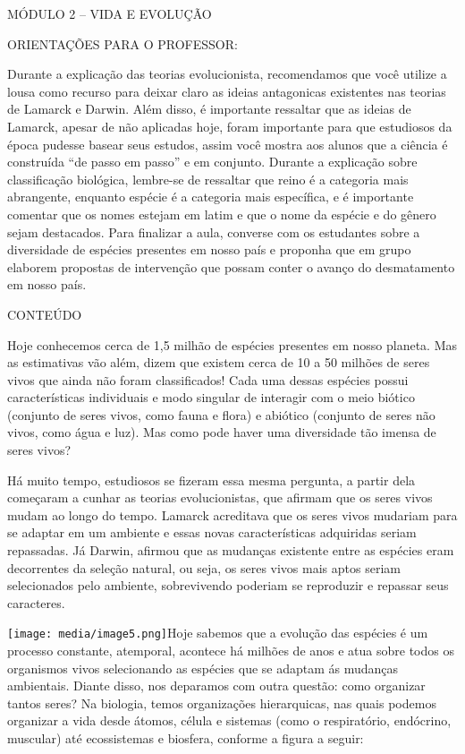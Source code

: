MÓDULO 2 -- VIDA E EVOLUÇÃO

ORIENTAÇÕES PARA O PROFESSOR:

Durante a explicação das teorias evolucionista, recomendamos que você
utilize a lousa como recurso para deixar claro as ideias antagonicas
existentes nas teorias de Lamarck e Darwin. Além disso, é importante
ressaltar que as ideias de Lamarck, apesar de não aplicadas hoje, foram
importante para que estudiosos da época pudesse basear seus estudos,
assim você mostra aos alunos que a ciência é construída ``de passo em
passo'' e em conjunto. Durante a explicação sobre classificação
biológica, lembre-se de ressaltar que reino é a categoria mais
abrangente, enquanto espécie é a categoria mais específica, e é
importante comentar que os nomes estejam em latim e que o nome da
espécie e do gênero sejam destacados. Para finalizar a aula, converse
com os estudantes sobre a diversidade de espécies presentes em nosso
país e proponha que em grupo elaborem propostas de intervenção que
possam conter o avanço do desmatamento em nosso país.

CONTEÚDO

Hoje conhecemos cerca de 1,5 milhão de espécies presentes em nosso
planeta. Mas as estimativas vão além, dizem que existem cerca de 10 a 50
milhões de seres vivos que ainda não foram classificados! Cada uma
dessas espécies possui características individuais e modo singular de
interagir com o meio biótico (conjunto de seres vivos, como fauna e
flora) e abiótico (conjunto de seres não vivos, como água e luz). Mas
como pode haver uma diversidade tão imensa de seres vivos?

Há muito tempo, estudiosos se fizeram essa mesma pergunta, a partir dela
começaram a cunhar as teorias evolucionistas, que afirmam que os seres
vivos mudam ao longo do tempo. Lamarck acreditava que os seres vivos
mudariam para se adaptar em um ambiente e essas novas características
adquiridas seriam repassadas. Já Darwin, afirmou que as mudanças
existente entre as espécies eram decorrentes da seleção natural, ou
seja, os seres vivos mais aptos seriam selecionados pelo ambiente,
sobrevivendo poderiam se reproduzir e repassar seus caracteres.

\texttt{[image: media/image5.png]}Hoje
sabemos que a evolução das espécies é um processo constante, atemporal,
acontece há milhões de anos e atua sobre todos os organismos vivos
selecionando as espécies que se adaptam ás mudanças ambientais. Diante
disso, nos deparamos com outra questão: como organizar tantos seres? Na
biologia, temos organizações hierarquicas, nas quais podemos organizar a
vida desde átomos, célula e sistemas (como o respiratório, endócrino,
muscular) até ecossistemas e biosfera, conforme a figura a seguir:

